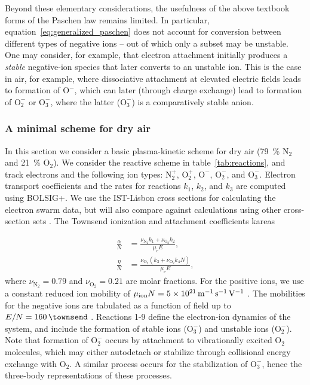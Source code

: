 \documentclass{iopjournal}
\newcommand{\e}{\ensuremath{\text{e}}}
\providecommand\Ntwo{\ensuremath{\textrm{N}_2}}
\providecommand\Otwo{\ensuremath{\textrm{O}_2}}
\providecommand\Ntwop{\ensuremath{\textrm{N}_2^+}}
\providecommand\Otwop{\ensuremath{\textrm{O}_2^+}}
\providecommand\Otwom{\ensuremath{\textrm{O}_2^-}}
\providecommand\Othreem{\ensuremath{\textrm{O}_3^-}}
\providecommand\Ominus{\ensuremath{\textrm{O}^-}}
\begin{document}
Beyond these elementary considerations, the usefulness of the above textbook forms of the Paschen law remains limited.
In particular, equation~\eqref{eq:generalized_paschen} does not account for conversion between different types of negative ions -- out of which only a subset may be unstable.
One may consider, for example, that electron attachment initially produces a \emph{stable} negative-ion species that later converts to an unstable ion.
This is the case in air, for example, where dissociative attachment at elevated electric fields leads to formation of $\Ominus$, which can later (through charge exchange) lead to formation of $\Otwom$ or $\Othreem$, where the latter ($\Othreem$) is a comparatively stable anion.

\subsubsection{A minimal scheme for dry air}
\label{sec:air_model}

In this section we consider a basic plasma-kinetic scheme for dry air (\SI{79}{\percent} $\Ntwo$ and \SI{21}{\percent} $\Otwo$).
We consider the reactive scheme in table~\ref{tab:reactions}, and track electrons and the following ion types: $\Ntwop$, $\Otwop$, $\Ominus$, $\Otwom$, and $\Othreem$.
Electron transport coefficients and the rates for reactions $k_1$, $k_2$, and $k_3$ are computed using BOLSIG+\cite{Hagelaar2005a}.
We use the IST-Lisbon \cite{lisbon} cross sections for calculating the electron swarm data, but will also compare against calculations using other cross-section sets \cite{phelps,trinity,biagi}.
The Townsend ionization and attachment coefficients kareas

\begin{align}
  \label{eq:alpha_air}
  \frac{\alpha}{N} &= \frac{\nu_{\Ntwo}k_1 + \nu_{\Otwo}k_2}{\mu_\e E},\\
  \label{eq:eta_air}
  \frac{\eta}{N} &= \frac{\nu_{\Otwo}(k_3 + \nu_{\Otwo}k_4N)}{\mu_\e E},
\end{align}
where $\nu_{\Ntwo}=0.79$ and $\nu_{\Otwo}=0.21$ are molar fractions.
For the positive ions, we use a constant reduced ion mobility of $\mu_{\textrm{ion}} N = \SI{5E21}{\per\meter\per\second\per\volt}$ \cite{Bhringer1987}.
The mobilities for the negative ions are tabulated as a function of field up to $E/N = \SI{160}{\townsend}$ \cite{Bhringer1987}.
Reactions 1-9 define the electron-ion dynamics of the system, and include the formation of stable ions ($\Othreem$) and unstable ions ($\Otwom$).
Note that formation of $\Otwom$ occurs by attachment to vibrationally excited $\Otwo$ molecules, which may either autodetach or stabilize through collisional energy exchange with $\Otwo$.
A similar process occurs for the stabilization of $\Othreem$, hence the three-body representations of these processes.
\end{document}
